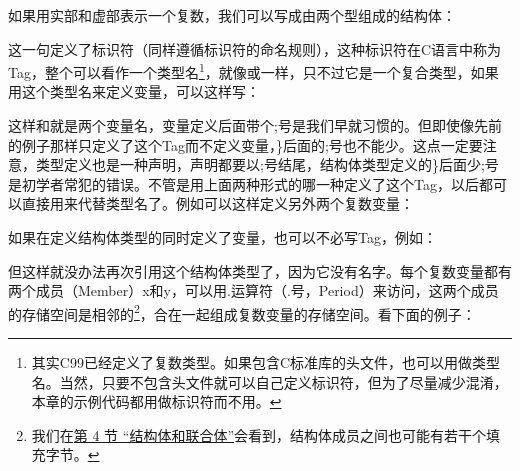 

如果用实部和虚部表示一个复数，我们可以写成由两个型组成的结构体：




这一句定义了标识符（同样遵循标识符的命名规则），这种标识符在C语言中称为Tag，整个可以看作一个类型名\footnote[12]{其实C99已经定义了复数类型。如果包含C标准库的头文件，也可以用做类型名。当然，只要不包含头文件就可以自己定义标识符，但为了尽量减少混淆，本章的示例代码都用做标识符而不用。}，就像或一样，只不过它是一个复合类型，如果用这个类型名来定义变量，可以这样写：




这样和就是两个变量名，变量定义后面带个;号是我们早就习惯的。但即使像先前的例子那样只定义了这个Tag而不定义变量，\}后面的;号也不能少。这点一定要注意，类型定义也是一种声明，声明都要以;号结尾，结构体类型定义的\}后面少;号是初学者常犯的错误。不管是用上面两种形式的哪一种定义了这个Tag，以后都可以直接用来代替类型名了。例如可以这样定义另外两个复数变量：




如果在定义结构体类型的同时定义了变量，也可以不必写Tag，例如：




但这样就没办法再次引用这个结构体类型了，因为它没有名字。每个复数变量都有两个成员（Member）x和y，可以用.运算符（.号，Period）来访问，这两个成员的存储空间是相邻的\footnote[13]{我们在\hyperlink{db.ch19s04.id2779313}{第 4 节 “结构体和联合体”}会看到，结构体成员之间也可能有若干个填充字节。}，合在一起组成复数变量的存储空间。看下面的例子：


